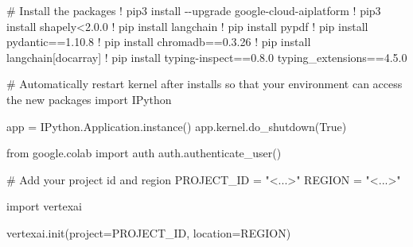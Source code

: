 \documentclass[
  letterpaper,
  DIV=11,
  numbers=noendperiod]{scrreprt}
\newenvironment{Shaded}{\begin{snugshade}}{\end{snugshade}}
\newcommand{\CommentTok}[1]{\textcolor[rgb]{0.37,0.37,0.37}{#1}}
\newcommand{\FloatTok}[1]{\textcolor[rgb]{0.68,0.00,0.00}{#1}}
\newcommand{\ImportTok}[1]{\textcolor[rgb]{0.00,0.46,0.62}{#1}}
\newcommand{\NormalTok}[1]{\textcolor[rgb]{0.00,0.23,0.31}{#1}}
\newcommand{\OperatorTok}[1]{\textcolor[rgb]{0.37,0.37,0.37}{#1}}
\newcommand{\StringTok}[1]{\textcolor[rgb]{0.13,0.47,0.30}{#1}}
\newcommand{\VariableTok}[1]{\textcolor[rgb]{0.07,0.07,0.07}{#1}}
\begin{document}
\begin{Shaded}
\begin{Highlighting}[]
\CommentTok{\# Install the packages}
\OperatorTok{!}\NormalTok{ pip3 install }\OperatorTok{{-}{-}}\NormalTok{upgrade google}\OperatorTok{{-}}\NormalTok{cloud}\OperatorTok{{-}}\NormalTok{aiplatform}
\OperatorTok{!}\NormalTok{ pip3 install shapely}\OperatorTok{\textless{}}\FloatTok{2.0.0}
\OperatorTok{!}\NormalTok{ pip install langchain}
\OperatorTok{!}\NormalTok{ pip install pypdf}
\OperatorTok{!}\NormalTok{ pip install pydantic}\OperatorTok{==}\FloatTok{1.10.8}
\OperatorTok{!}\NormalTok{ pip install chromadb}\OperatorTok{==}\FloatTok{0.3.26}
\OperatorTok{!}\NormalTok{ pip install langchain[docarray]}
\OperatorTok{!}\NormalTok{ pip install typing}\OperatorTok{{-}}\NormalTok{inspect}\OperatorTok{==}\FloatTok{0.8.0}\NormalTok{ typing\_extensions}\OperatorTok{==}\FloatTok{4.5.0}
\end{Highlighting}
\end{Shaded}

\begin{Shaded}
\begin{Highlighting}[]
\CommentTok{\# Automatically restart kernel after installs so that your environment can access the new packages}
\ImportTok{import}\NormalTok{ IPython}

\NormalTok{app }\OperatorTok{=}\NormalTok{ IPython.Application.instance()}
\NormalTok{app.kernel.do\_shutdown(}\VariableTok{True}\NormalTok{)}
\end{Highlighting}
\end{Shaded}

\begin{Shaded}
\begin{Highlighting}[]
\ImportTok{from}\NormalTok{ google.colab }\ImportTok{import}\NormalTok{ auth}
\NormalTok{auth.authenticate\_user()}
\end{Highlighting}
\end{Shaded}

\begin{Shaded}
\begin{Highlighting}[]
\CommentTok{\# Add your project id and region}
\NormalTok{PROJECT\_ID }\OperatorTok{=} \StringTok{"\textless{}...\textgreater{}"}
\NormalTok{REGION }\OperatorTok{=} \StringTok{"\textless{}...\textgreater{}"}

\ImportTok{import}\NormalTok{ vertexai}

\NormalTok{vertexai.init(project}\OperatorTok{=}\NormalTok{PROJECT\_ID, location}\OperatorTok{=}\NormalTok{REGION)}
\end{Highlighting}
\end{Shaded}
\end{document}
